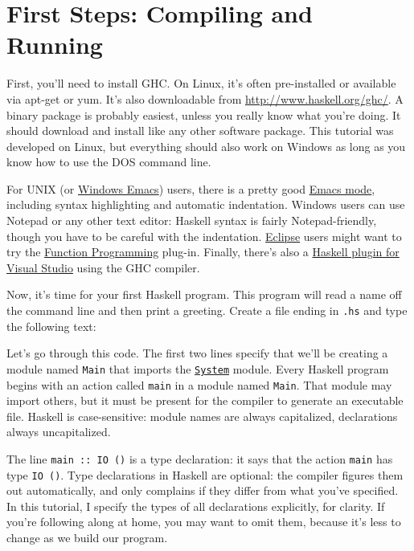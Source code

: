 \chapter[First Steps]{First Steps: Compiling and Running}
 
 
First, you'll need to install GHC. On Linux, it's often pre-installed or available via apt-get or yum. It's also downloadable from \url{http://www.haskell.org/ghc/}. A binary package is probably easiest, unless you really know what you're doing. It should download and install like any other software package. This tutorial was developed on Linux, but everything should also work on Windows as long as you know how to use the DOS command line.
 
For UNIX (or \href{http://www.gnu.org/software/emacs/windows/ntemacs.html}{Windows Emacs}) users, there is a pretty good \href{http://haskell.org/haskell-mode/}{Emacs mode}, including syntax highlighting and automatic indentation. Windows users can use Notepad or any other text editor: Haskell syntax is fairly Notepad-friendly, though you have to be careful with the indentation. \href{http://www.eclipse.org/}{Eclipse} users might want to try the \href{http://eclipsefp.sourceforge.net/haskell/}{Function Programming} plug-in. Finally, there's also a \href{http://www.haskell.org/visualhaskell/}{Haskell plugin for Visual Studio} using the GHC compiler.
 
Now, it's time for your first Haskell program. This program will read a name off the command line and then print a greeting. Create a file ending in \verb|.hs| and type the following text:
 
 
Let's go through this code. The first two lines specify that we'll be creating a module named \verb|Main| that imports the \href{http://www.haskell.org/onlinereport/system.html}{\texttt{System}} module. Every Haskell program begins with an action called \verb|main| in a module named \verb|Main|. That module may import others, but it must be present for the compiler to generate an executable file. Haskell is case-sensitive: module names are always capitalized, declarations always uncapitalized.
 
The line \lstinline|main :: IO ()| is a type declaration: it says that the action \verb|main| has type \lstinline|IO ()|. Type declarations in Haskell are optional: the compiler figures them out automatically, and only complains if they differ from what you've specified. In this tutorial, I specify the types of all declarations explicitly, for clarity. If you're following along at home, you may want to omit them, because it's less to change as we build our program.
 
